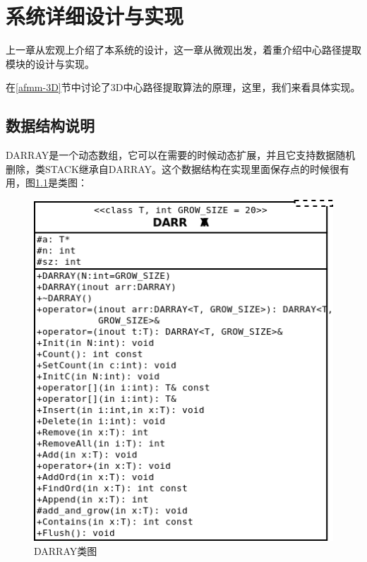 \chapter{系统详细设计与实现}

上一章从宏观上介绍了本系统的设计，这一章从微观出发，着重介绍中心路径提取模块的设计与实现。

在\ref{afmm-3D}节中讨论了3D中心路径提取算法的原理，这里，我们来看具体实现。
\section{数据结构说明}

DARRAY是一个动态数组，它可以在需要的时候动态扩展，并且它支持数据随机删除，类STACK继承自DARRAY。这个数据结构在实现里面保存点的时候很有用，图\ref{darray_class}是类图：
\begin{figure}[h!]
    \centering
    \includegraphics[width=300bp]{figure/darray.png}
    \caption{DARRAY类图}
    \label{darray_class}
\end{figure}

